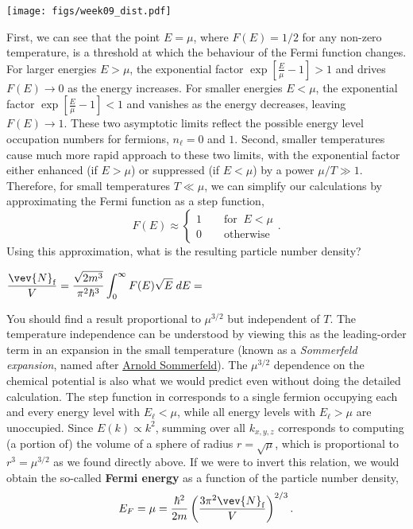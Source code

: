 \begin{center}\texttt{[image: figs/week09\_dist.pdf]}\end{center}

First, we can see that the point $E = \mu$, where $F(E) = 1 / 2$ for any non-zero temperature, is a threshold at which the behaviour of the Fermi function changes.
For larger energies $E > \mu$, the exponential factor $\exp\left[\frac{E}{\mu} - 1\right] > 1$ and drives $F(E) \to 0$ as the energy increases.
For smaller energies $E < \mu$, the exponential factor $\exp\left[\frac{E}{\mu} - 1\right] < 1$ and vanishes as the energy decreases, leaving $F(E) \to 1$.
These two asymptotic limits reflect the possible energy level occupation numbers for fermions, $n_{\ell} = 0$ and $1$.
Second, smaller temperatures cause much more rapid approach to these two limits, with the exponential factor either enhanced (if $E > \mu$) or suppressed (if $E < \mu$) by a power $\mu / T \gg 1$.
Therefore, for small temperatures $T \ll \mu$, we can simplify our calculations by approximating the Fermi function as a step function,
\begin{equation}
  \label{eq:Fermi_step}
  F(E) \approx \left\{\begin{array}{l}1 \qquad \mbox{for } \ E < \mu \\
                                      0 \qquad \mbox{otherwise}\end{array}\right. .
\end{equation}
Using this approximation, what is the resulting particle number density?
\begin{mdframed}
  $\displaystyle \frac{\vev{N}_{\text{f}}}{V} = \frac{\sqrt{2m^3}}{\pi^2 \hbar^3} \int_0^{\infty} F(E) \sqrt{E} \; dE = $ \\[100 pt]
\end{mdframed}

You should find a result proportional to $\mu^{3 / 2}$ but independent of $T$.
The temperature independence can be understood by viewing this as the leading-order term in an expansion in the small temperature (known as a \textit{Sommerfeld expansion}, named after \href{https://en.wikipedia.org/wiki/Arnold_Sommerfeld}{Arnold Sommerfeld}).
The $\mu^{3 / 2}$ dependence on the chemical potential is also what we would predict even without doing the detailed calculation.
The step function in  corresponds to a single fermion occupying each and every energy level with $E_{\ell} < \mu$, while all energy levels with $E_{\ell} > \mu$ are unoccupied.
Since $E(k) \propto k^2$, summing over all $k_{x, y, z}$ corresponds to computing (a portion of) the volume of a sphere of radius $r = \sqrt{\mu}$, which is proportional to $r^3 = \mu^{3 / 2}$ as we found directly above.
If we were to invert this relation, we would obtain the so-called \textbf{Fermi energy} as a function of the particle number density,
\begin{equation}
  \label{eq:Fermi_energy}
  E_F = \mu = \frac{\hbar^2}{2m}\left(\frac{3\pi^2 \vev{N}_{\text{f}}}{V}\right)^{2 / 3}.
\end{equation}

